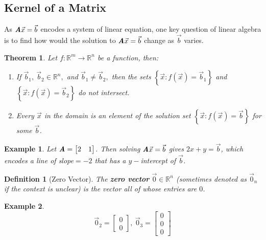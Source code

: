 \documentclass[12pt, a4paper]{article}
\newtheorem{thm}{Theorem}[subsection]
\newtheorem{df}{Definition}[subsection]
\newtheorem{eg}{Example}[subsection]
\def\R{{\mathbb{R}}}
\def\vecx{\vec{x}}
\def\vecb{\vec{b}}
\def\matrixA{\textbf{\emph{A}}}
\begin{document}
\subsection{Kernel of a Matrix}

As $\matrixA\vecx=\vecb$ encodes a system of linear equation, one key question of linear algebra is to find how would the solution to $\matrixA\vecx=\vecb$ change as $\vecb$ varies. 

\begin{thm}
	Let $f:\R^m\to\R^n$ be a function, then: 
	\begin{enumerate}
		\item If $\vecb_1,\ \vecb_2\in\R^n,$ and $\vecb_1\neq\vecb_2,$ then the sets $\left\{\vecx: f(\vecx)=\vecb_1\right\}$ and $\left\{\vecx: f(\vecx)=\vecb_2\right\}$ do not intersect. 
		\item Every $\vecx$ in the domain is an element of the solution set $\left\{\vecx: f(\vecx)=\vecb\right\}$ for some $\vecb$.
	\end{enumerate}
\end{thm}
\begin{eg}
	Let $\matrixA=\begin{bmatrix}2&1\end{bmatrix}$. Then solving $\matrixA\vecx=\vecb$ gives $2x+y=\vecb$, which encodes a line of slope$=-2$ that has a $y-$intercept of $\vecb$.	
\end{eg}
\begin{df}[Zero Vector]
	The \textbf{zero vector} $\vec{0}\in\R^n$ (sometimes denoted as $\vec{0}_n$ if the context is unclear) is the vector all of whose entries are $0$.
\end{df}
\begin{eg}
	\[\vec{0}_2=\begin{bmatrix}0\\0	\end{bmatrix},\ \vec{0}_3=\begin{bmatrix}0\\0\\0\end{bmatrix}\]	
\end{eg}
\end{document}
